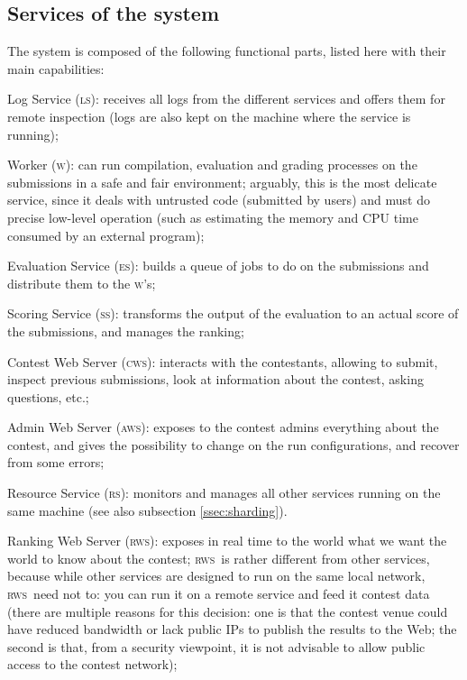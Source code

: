 \documentclass[a4paper,8pt]{amsart}
\newcommand{\LS}{\textsc{ls}}
\newcommand{\ES}{\textsc{es}}
\newcommand{\RS}{\textsc{rs}}
\newcommand{\WS}{\textsc{w}}
\renewcommand{\SS}{\textsc{ss}}
\newcommand{\CWS}{\textsc{cws}}
\newcommand{\AWS}{\textsc{aws}}
\newcommand{\RWS}{\textsc{rws}}
\newenvironment{squishlist}{%
  \begin{list}{\textbullet}%
    { \setlength{\itemsep}{0pt}%
      \setlength{\parsep}{3pt}%
      \setlength{\topsep}{3pt}%
      \setlength{\partopsep}{0pt}%
      \setlength{\leftmargin}{1.5em}%
      \setlength{\labelwidth}{1em}%
      \setlength{\labelsep}{0.5em} }%
}{\end{list}}
\begin{document}
\begin{multicols}{2}
  \subsection{Services of the system}

  The system is composed of the following functional parts, listed
  here with their main capabilities:
  \begin{squishlist}
  \item Log Service (\LS{}): receives all logs from the different
    services and offers them for remote inspection (logs are also kept
    on the machine where the service is running);
  \item Worker (\WS{}): can run compilation, evaluation and grading
    processes on the submissions in a safe and fair environment;
    arguably, this is the most delicate service, since it deals with
    untrusted code (submitted by users) and must do precise low-level
    operation (such as estimating the memory and CPU time consumed by
    an external program);
  \item Evaluation Service (\ES{}): builds a queue of jobs to do on the
    submissions and distribute them to the \WS{}'s;
  \item Scoring Service (\SS{}): transforms the output of the
    evaluation to an actual score of the submissions, and manages the
    ranking;
  \item Contest Web Server (\CWS{}): interacts with the contestants,
    allowing to submit, inspect previous submissions, look at
    information about the contest, asking questions, etc.;
  \item Admin Web Server (\AWS{}): exposes to the contest admins
    everything about the contest, and gives the possibility to change
    on the run configurations, and recover from some errors;
  \item Resource Service (\RS): monitors and manages all other
    services running on the same machine (see also subsection
    \ref{ssec:sharding}).
  \item Ranking Web Server (\RWS{}): exposes in real time to the world
    what we want the world to know about the contest; \RWS\ is rather
    different from other services, because while other services are
    designed to run on the same local network, \RWS\ need not to: you
    can run it on a remote service and feed it contest data (there are
    multiple reasons for this decision: one is that the contest venue
    could have reduced bandwidth or lack public IPs to publish the
    results to the Web; the second is that, from a security viewpoint,
    it is not advisable to allow public access to the contest
    network);
  \end{squishlist}


\end{multicols}
\end{document}
